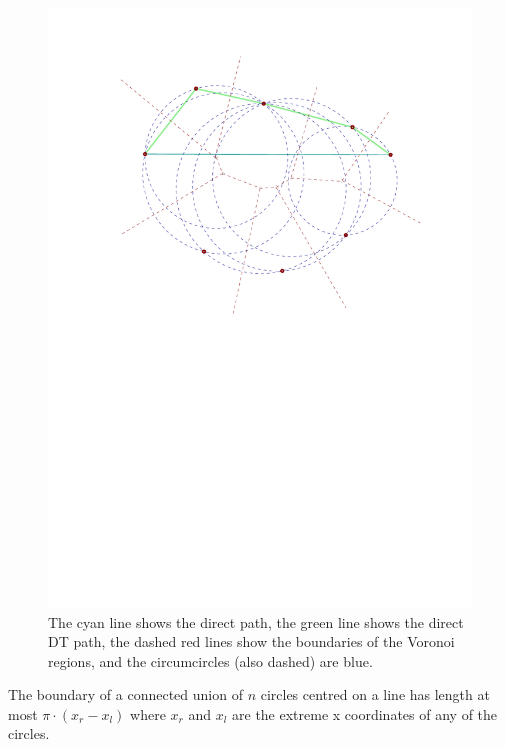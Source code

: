 \documentclass{tufte-handout}
\begin{document}
\begin{figure}
  \includegraphics[scale=0.8]{figures/one-sided_path.pdf}
  \caption{The cyan line shows the direct path, the green line shows
    the direct DT path, the dashed red lines show the boundaries of
    the Voronoi regions, and the circumcircles (also dashed) are
    blue.}
\end{figure}

\begin{Lemma}[3]

  \label{lemma:boundary:circles}

  The boundary of a connected union of $n$ circles centred on a line
  has length at most $\pi \cdot ( x_r - x_l )$ where $x_r$ and $x_l$
  are the extreme x coordinates of any of the circles.
  
\end{Lemma}
\end{document}
